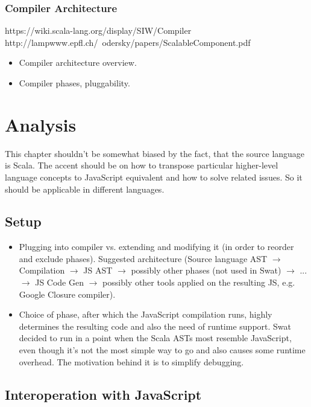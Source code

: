 \documentclass[12pt,a4paper]{report}
\begin{document}
\subsection{Compiler Architecture}

https://wiki.scala-lang.org/display/SIW/Compiler
http://lampwww.epfl.ch/~odersky/papers/ScalableComponent.pdf

\begin{itemize}
\item Compiler architecture overview.
\item Compiler phases, pluggability.
\end{itemize}



\chapter{Analysis}

This chapter shouldn't be somewhat biased by the fact, that the source language is Scala. The accent should be on how to transpose particular higher-level language concepts to JavaScript equivalent and how to solve related issues. So it should be applicable in different languages.

\section{Setup}

\begin{itemize}
\item Plugging into compiler vs. extending and modifying it (in order to reorder and exclude phases). Suggested architecture (Source language AST $\rightarrow$ Compilation $\rightarrow$ JS AST $\rightarrow$ possibly other phases (not used in Swat) $\rightarrow$ ... $\rightarrow$ JS Code Gen $\rightarrow$ possibly other tools applied on the resulting JS, e.g. Google Closure compiler). 
\item Choice of phase, after which the JavaScript compilation runs, highly determines the resulting code and also the need of runtime support. Swat decided to run in a point when the Scala ASTs most resemble JavaScript, even though it's not the most simple way to go and also causes some runtime overhead. The motivation behind it is to simplify debugging.
\end{itemize}

\section{Interoperation with JavaScript}
\end{document}
